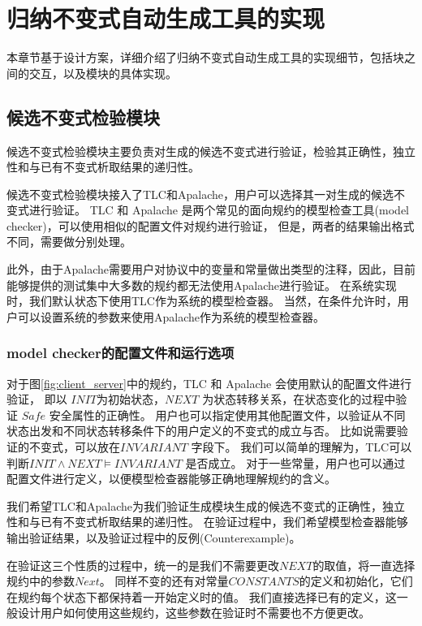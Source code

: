 \chapter{归纳不变式自动生成工具的实现}

本章节基于设计方案，详细介绍了归纳不变式自动生成工具的实现细节，包括块之间的交互，以及模块的具体实现。

\section{候选不变式检验模块}

候选不变式检验模块主要负责对生成的候选不变式进行验证，检验其正确性，独立性和与已有不变式析取结果的递归性。

候选不变式检验模块接入了TLC和Apalache，用户可以选择其一对生成的候选不变式进行验证。
TLC 和 Apalache 是两个常见的面向\TLA 规约的模型检查工具(model checker)，可以使用相似的配置文件对规约进行验证，
但是，两者的结果输出格式不同，需要做分别处理。

此外，由于Apalache需要用户对协议中的变量和常量做出类型的注释，因此，目前能够提供的测试集中大多数的规约都无法使用Apalache进行验证。
在系统实现时，我们默认状态下使用TLC作为系统的模型检查器。
当然，在条件允许时，用户可以设置系统的参数来使用Apalache作为系统的模型检查器。

\subsection{model checker的配置文件和运行选项}

对于图\ref{fig:client_server}中的规约，TLC 和 Apalache 会使用默认的配置文件进行验证，
即以 $INIT$为初始状态，$NEXT$ 为状态转移关系，在状态变化的过程中验证 $Safe$ 安全属性的正确性。
用户也可以指定使用其他配置文件，以验证从不同状态出发和不同状态转移条件下的用户定义的不变式的成立与否。
比如说需要验证的不变式，可以放在$INVARIANT$ 字段下。
我们可以简单的理解为，TLC可以判断$INIT \wedge NEXT \vDash INVARIANT$ 是否成立。
对于一些常量，用户也可以通过配置文件进行定义，以便模型检查器能够正确地理解规约的含义。

我们希望TLC和Apalache为我们验证生成模块生成的候选不变式的正确性，独立性和与已有不变式析取结果的递归性。
在验证过程中，我们希望模型检查器能够输出验证结果，以及验证过程中的反例(Counterexample)。

在验证这三个性质的过程中，统一的是我们不需要更改$NEXT$的取值，将一直选择规约中的参数$Next$。
同样不变的还有对常量$CONSTANTS$的定义和初始化，它们在规约每个状态下都保持着一开始定义时的值。
我们直接选择已有的定义，这一般设计用户如何使用这些规约，这些参数在验证时不需要也不方便更改。

